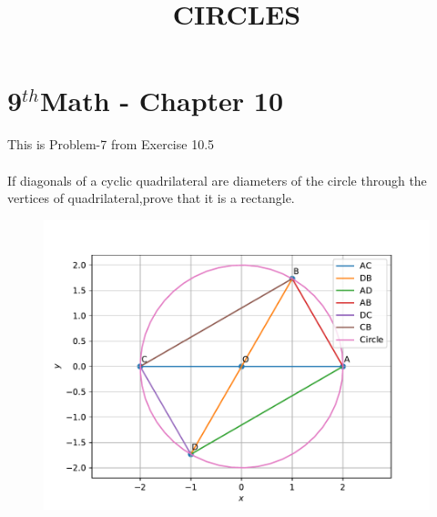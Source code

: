 \documentclass[10pt]{article}
\begin{document}
\begin{center}
\title{\textbf{CIRCLES}}
\date{\vspace{-5ex}}
\maketitle
\end{center}
\section*{9$^{th}$Math - Chapter 10}
This is Problem-7 from Exercise 10.5\\\\
If diagonals of a cyclic quadrilateral are diameters of the circle through the vertices of quadrilateral,prove that it is a rectangle.\\

\begin{figure}[!h]
	\begin{center}
		\includegraphics[width=\columnwidth]{./figs/fig.pdf}
	\end{center}
\caption{}
\label{fig:1}
\end{figure}
\end{document}
